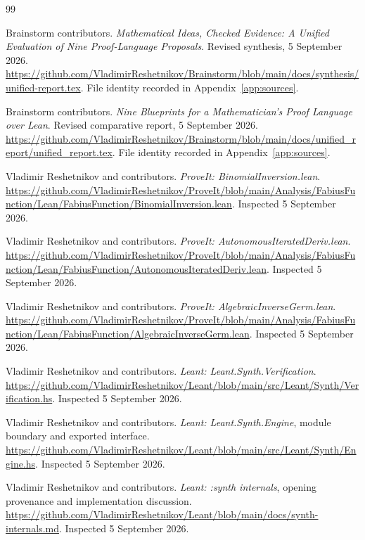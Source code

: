 \documentclass[11pt,letterpaper]{article}
\theoremstyle{definition}
\theoremstyle{remark}
\begin{document}
\clearpage
{}
{}
\begin{thebibliography}{99}
\small

Brainstorm contributors.
\emph{Mathematical Ideas, Checked Evidence: A Unified Evaluation of Nine
Proof-Language Proposals}. Revised synthesis, 5 September 2026.
\url{https://github.com/VladimirReshetnikov/Brainstorm/blob/main/docs/synthesis/unified-report.tex}.
File identity recorded in Appendix~\ref{app:sources}.

Brainstorm contributors.
\emph{Nine Blueprints for a Mathematician's Proof Language over Lean}.
Revised comparative report, 5 September 2026.
\url{https://github.com/VladimirReshetnikov/Brainstorm/blob/main/docs/unified_report/unified_report.tex}.
File identity recorded in Appendix~\ref{app:sources}.

Vladimir Reshetnikov and contributors.
\emph{ProveIt: BinomialInversion.lean}.
\url{https://github.com/VladimirReshetnikov/ProveIt/blob/main/Analysis/FabiusFunction/Lean/FabiusFunction/BinomialInversion.lean}.
Inspected 5 September 2026.

Vladimir Reshetnikov and contributors.
\emph{ProveIt: AutonomousIteratedDeriv.lean}.
\url{https://github.com/VladimirReshetnikov/ProveIt/blob/main/Analysis/FabiusFunction/Lean/FabiusFunction/AutonomousIteratedDeriv.lean}.
Inspected 5 September 2026.

Vladimir Reshetnikov and contributors.
\emph{ProveIt: AlgebraicInverseGerm.lean}.
\url{https://github.com/VladimirReshetnikov/ProveIt/blob/main/Analysis/FabiusFunction/Lean/FabiusFunction/AlgebraicInverseGerm.lean}.
Inspected 5 September 2026.

Vladimir Reshetnikov and contributors.
\emph{Leant: Leant.Synth.Verification}.
\url{https://github.com/VladimirReshetnikov/Leant/blob/main/src/Leant/Synth/Verification.hs}.
Inspected 5 September 2026.

Vladimir Reshetnikov and contributors.
\emph{Leant: Leant.Synth.Engine}, module boundary and exported interface.
\url{https://github.com/VladimirReshetnikov/Leant/blob/main/src/Leant/Synth/Engine.hs}.
Inspected 5 September 2026.

Vladimir Reshetnikov and contributors.
\emph{Leant: :synth internals}, opening provenance and implementation discussion.
\url{https://github.com/VladimirReshetnikov/Leant/blob/main/docs/synth-internals.md}.
Inspected 5 September 2026.


\end{thebibliography}
\end{document}
